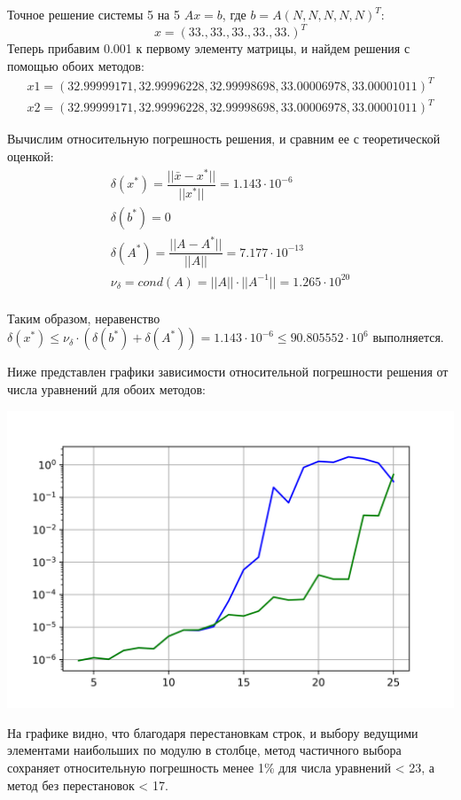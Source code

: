 \documentclass[a4paper,12pt]{report} %
\begin{document}
Точное решение системы 5 на 5 $Ax = b$, где $b = A(N, N, N, N, N)^T$:
\[
	x = (33., 33., 33., 33. , 33.)^T
\]
Теперь прибавим 0.001 к первому элементу матрицы, и найдем решения с помощью обоих методов:
\begin{gather*}
	x1 = (32.99999171, 32.99996228, 32.99998698, 33.00006978, 33.00001011)^T \\
	x2 = (32.99999171, 32.99996228, 32.99998698, 33.00006978, 33.00001011)^T
\end{gather*}

Вычислим относительную погрешность решения, и сравним ее с теоретической оценкой:
\begin{gather*}
	\delta(x^*) = \dfrac{|| \bar{x} - x^*||}{||x^*||} = 1.143\cdot 10^{-6} \\
	\delta(b^*) = 0 \\
	\delta(A^*) = \dfrac{|| A - A^*||}{||A||} = 7.177 \cdot 10^{-13}\\
	\nu_{\delta} = cond(A) = ||A|| \cdot ||A^{-1}|| = 1.265 \cdot 10^{20}\\
\end{gather*}

Таким образом, неравенство $\delta(x^*) \leq \nu_{\delta} \cdot (\delta(b^*) + \delta(A^*)) = 1.143\cdot 10^{-6} \leq 90.805552 \cdot 10^6$ выполняется.

Ниже представлен графики зависимости относительной погрешности решения от числа уравнений для обоих методов:

\noindent\includegraphics{3.1_plot.png}

На графике видно, что благодаря перестановкам строк, и выбору ведущими элементами наибольших по модулю в столбце,
метод частичного выбора сохраняет относительную погрешность менее 1\% для числа уравнений < 23, а метод без перестановок < 17.
\end{document}
